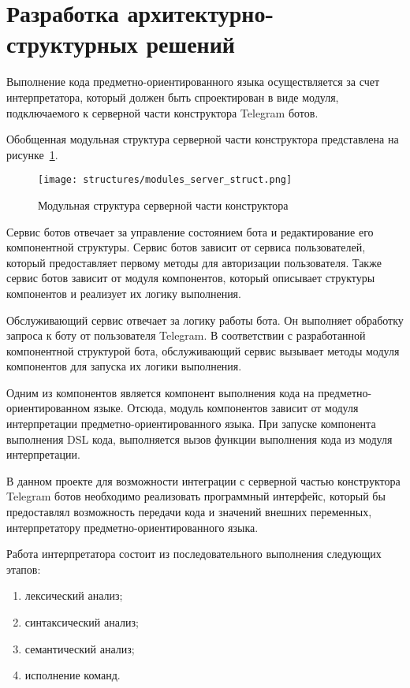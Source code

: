 \newpage

\section{Разработка архитектурно-структурных решений}

Выполнение кода предметно-ориентированного языка осуществляется за счет интерпретатора,
который должен быть спроектирован в виде модуля, подключаемого к серверной части конструктора Telegram ботов.

Обобщенная модульная структура серверной части конструктора представлена на рисунке~\ref{f:modules_server_struct}.

\begin{figure}[ht]
	\centering
	\vspace{\toppaddingoffigure}
	\texttt{[image: structures/modules\_server\_struct.png]}
	\caption{Модульная структура серверной части конструктора}
	\label{f:modules_server_struct}
\end{figure}

Сервис ботов отвечает за управление состоянием бота и редактирование его компонентной структуры.
Сервис ботов зависит от сервиса пользователей, который предоставляет первому методы для авторизации пользователя.
Также сервис ботов зависит от модуля компонентов, который описывает структуры компонентов и реализует их логику выполнения.

Обслуживающий сервис отвечает за логику работы бота. 
Он выполняет обработку запроса к боту от пользователя Telegram.
В соответствии с разработанной компонентной структурой бота, обслуживающий сервис вызывает методы модуля компонентов для запуска их логики выполнения.

Одним из компонентов является компонент выполнения кода на предметно-ориентированном языке.
Отсюда, модуль компонентов зависит от модуля интерпретации предметно-ориентированного языка.
При запуске компонента выполнения DSL кода, выполняется вызов функции выполнения кода из модуля интерпретации.

В данном проекте для возможности интеграции с серверной частью конструктора Telegram ботов необходимо реализовать программный интерфейс,
который бы предоставлял возможность передачи кода и значений внешних переменных, интерпретатору предметно-ориентированного языка.

Работа интерпретатора состоит из последовательного выполнения следующих этапов:
\begin{enumerate}
	\item лексический анализ;
	\item синтаксический анализ;
	\item семантический анализ;
	\item исполнение команд.
\end{enumerate}

